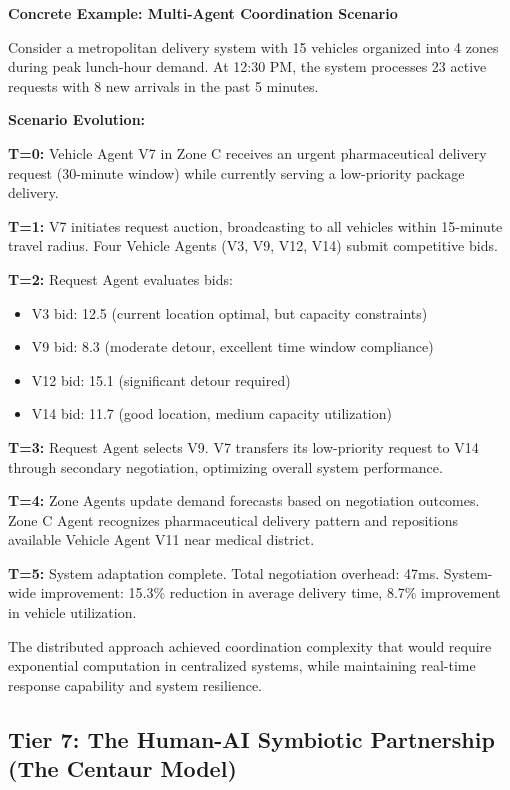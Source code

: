\documentclass{article}
\begin{document}
\textbf{Concrete Example: Multi-Agent Coordination Scenario}

Consider a metropolitan delivery system with 15 vehicles organized into 4 zones during peak lunch-hour demand. At 12:30 PM, the system processes 23 active requests with 8 new arrivals in the past 5 minutes.

\textbf{Scenario Evolution:}

\textbf{T=0:} Vehicle Agent V7 in Zone C receives an urgent pharmaceutical delivery request (30-minute window) while currently serving a low-priority package delivery.

\textbf{T=1:} V7 initiates request auction, broadcasting to all vehicles within 15-minute travel radius. Four Vehicle Agents (V3, V9, V12, V14) submit competitive bids.

\textbf{T=2:} Request Agent evaluates bids:
\begin{itemize}
\item V3 bid: 12.5 (current location optimal, but capacity constraints)
\item V9 bid: 8.3 (moderate detour, excellent time window compliance)  
\item V12 bid: 15.1 (significant detour required)
\item V14 bid: 11.7 (good location, medium capacity utilization)
\end{itemize}

\textbf{T=3:} Request Agent selects V9. V7 transfers its low-priority request to V14 through secondary negotiation, optimizing overall system performance.

\textbf{T=4:} Zone Agents update demand forecasts based on negotiation outcomes. Zone C Agent recognizes pharmaceutical delivery pattern and repositions available Vehicle Agent V11 near medical district.

\textbf{T=5:} System adaptation complete. Total negotiation overhead: 47ms. System-wide improvement: 15.3\% reduction in average delivery time, 8.7\% improvement in vehicle utilization.

The distributed approach achieved coordination complexity that would require exponential computation in centralized systems, while maintaining real-time response capability and system resilience.

\subsection{Tier 7: The Human-AI Symbiotic Partnership (The Centaur Model)}
\end{document}
